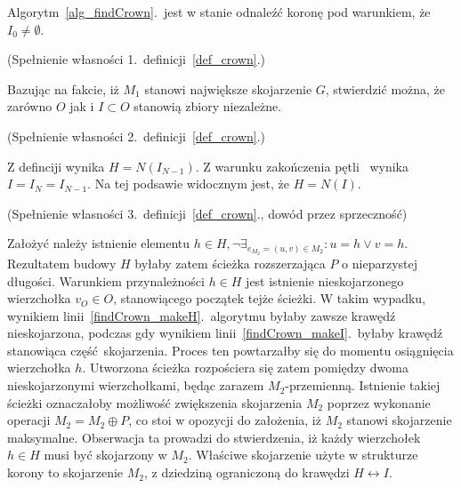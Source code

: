 \begin{theorem}
  Algorytm~\ref{alg_findCrown}.\ jest w stanie odnaleźć koronę pod warunkiem, że
  $I_0\neq\emptyset$.
\end{theorem}
\begin{bproof} (Spełnienie własności 1.\ definicji~\ref{def_crown}.)
  \par{
    Bazując na fakcie, iż $M_1$ stanowi największe skojarzenie $G$, stwierdzić
    można, że zarówno $O$ jak i $I \subset O$ stanowią zbiory niezależne.
  }
\end{bproof}
\begin{bproof} (Spełnienie własności 2.\ definicji~\ref{def_crown}.)
  \par{
    Z definciji wynika $H=N(I_{N-1})$.
    Z warunku zakończenia pętli~ wynika 
    $I=I_N=I_{N-1}$.
    Na tej podsawie widocznym jest, że $H=N(I)$.
  }
\end{bproof}
\begin{bproof} (Spełnienie własności 3.\ definicji~\ref{def_crown}., dowód przez
  sprzeczność)\par{
    Założyć należy istnienie elementu $h \in H, \neg\exists_{e_{M_2}=(u,v) \in
  M_2}: u=h \lor v = h$.
  Rezultatem budowy $H$ byłaby zatem ścieżka rozszerzająca $P$ o nieparzystej
  długości. 
  Warunkiem przynależności $h \in H$ jest istnienie nieskojarzonego wierzchołka
  $v_O \in O$, stanowiącego początek tejże ścieżki.
  W takim wypadku, wynikiem linii~\ref{findCrown_makeH}.\ algorytmu byłaby
  zawsze krawędź nieskojarzona, podczas gdy wynikiem
  linii~\ref{findCrown_makeI}.\ byłaby  krawędź stanowiąca część~skojarzenia.
  Proces ten powtarzałby się do momentu osiągnięcia wierzchołka $h$.
  Utworzona ścieżka rozpościera się zatem pomiędzy dwoma nieskojarzonymi
  wierzchołkami, będąc zarazem $M_2$-przemienną.
  Istnienie takiej ścieżki oznaczałoby możliwość zwiększenia skojarzenia $M_2$
  poprzez wykonanie operacji $M_2=M_2\oplus P$, co stoi w opozycji do
  założenia, iż $M_2$ stanowi skojarzenie maksymalne.
  Obserwacja ta prowadzi do stwierdzenia, iż każdy wierzchołek $h \in H$ musi
  być skojarzony w $M_2$.
  Właściwe skojarzenie użyte w strukturze korony to skojarzenie $M_2$, z
  dziedziną ograniczoną do krawędzi $H \leftrightarrow I$.
}
\end{bproof}

